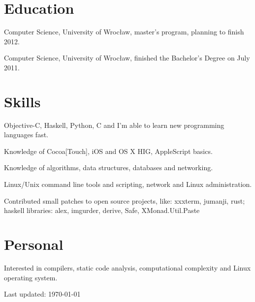 \documentclass[letterpaper]{article}
\def\footerlink{}
\renewenvironment{itemize}{
  \begin{list}{}{
    \setlength{\leftmargin}{1.5em}
  }
}{
  \end{list}
}
\begin{document}
\section*{Education}

\begin{itemize}
  	\item Computer Science, University of Wrocław, master's program, planning to finish 2012.
  	\item Computer Science, University of Wrocław, finished the Bachelor's Degree on July 2011.
\end{itemize}

\section*{Skills}
\begin{itemize}
	\item Objective-C, Haskell, Python, C and I'm able to learn new programming languages fast.
	\item Knowledge of Cocoa[Touch], iOS and OS X HIG, AppleScript basics.
	\item Knowledge of algorithms, data structures, databases and networking.
	\item Linux/Unix command line tools and scripting, network and Linux administration.
	\item Contributed small patches to open source projects, like: xxxterm, jumanji, rust;\\
		 haskell libraries: alex, imgurder, derive, Safe, XMonad.Util.Paste
\end{itemize}

\section*{Personal}

\begin{itemize}
	\item Interested in compilers, static code analysis, computational complexity and Linux operating system.
\end{itemize}

\bigskip

\begin{center}
  \begin{footnotesize}
    Last updated: \today \\
    \href{\footerlink}{\texttt{\footerlink}}
  \end{footnotesize}
\end{center}
\end{document}

